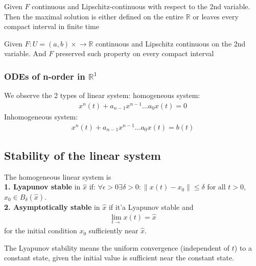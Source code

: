 \begin{theorem}
	Given $F$ continuous and Lipschitz-continuous with respect to the 2nd variable. Then the maximal solution is either defined on the entire $\mathbb{R}$ or leaves every compact interval in finite time
\end{theorem}

\begin{corollary}
	Given $F: U = (a, b) \times \mathbb \rightarrow \mathbb{R}$ continuous and Lipschitz continuous on the 2nd variable. And $F$ preserved such property on every compact interval 
\end{corollary}


\subsubsection*{ODEs of n-order in $\mathbb{R}^1$}
We observe the 2 types of linear system:
homogeneous system:
\begin{align}
	x^{n}(t) + a_{n-1}x^{n-1} \dots a_0 x(t) = 0
\end{align}
Inhomogeneous system:
\begin{align}
	x^n(t) + a_{n-1}x^{n-1} \dots a_0 x(t) = b(t)
\end{align}

\begin{theorem}
\end{theorem}


\subsection{Stability of the linear system}
\begin{definition}
The homogeneous linear system is \\
\textbf{1. Lyapunov stable} in $\hat{x}$ if: 
	$\forall \epsilon > 0 \exists \delta > 0: \|x(t) - x_0\| \le \delta$ for all $t > 0$, $x_0 \in B_\delta(\hat{x})$.\\
\textbf{2. Asymptotically stable} in $\hat{x}$ if it'a Lyapunov stable and 
\begin{align*}
	\lim_{t \rightarrow} x(t) = \hat{x}
\end{align*}
for the initial condition $x_0$ sufficiently near $\hat{x}$. 
\end{definition}
\begin{remark}
The Lyapunov stability means the uniform convergence (independent of $t$) to a constant state, given the initial value is sufficient near the constant state. 	
\end{remark}



